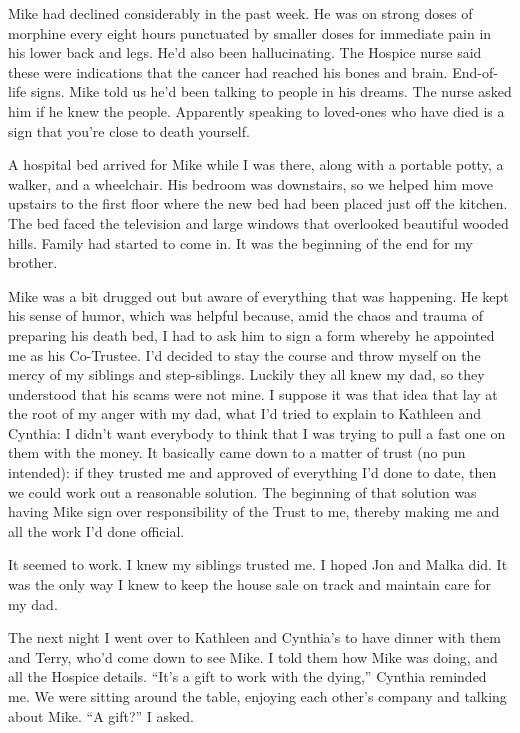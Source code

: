 \documentclass[12pt]{book}
\begin{document}
Mike had declined considerably in the past week. He was on strong doses of morphine every eight hours punctuated by smaller doses for immediate pain in his lower back and legs. He'd also been hallucinating. The Hospice nurse said these were indications that the cancer had reached his bones and brain. End-of-life signs. Mike told us he'd been talking to people in his dreams. The nurse asked him if he knew the people. Apparently speaking to loved-ones who have died is a sign that you're close to death yourself.

A hospital bed arrived for Mike while I was there, along with a portable potty, a walker, and a wheelchair. His bedroom was downstairs, so we helped him move upstairs to the first floor where the new bed had been placed just off the kitchen. The bed faced the television and large windows that overlooked beautiful wooded hills. Family had started to come in. It was the beginning of the end for my brother.

Mike was a bit drugged out but aware of everything that was happening. He kept his sense of humor, which was helpful because, amid the chaos and trauma of preparing his death bed, I had to ask him to sign a form whereby he appointed me as his Co-Trustee. I'd decided to stay the course and throw myself on the mercy of my siblings and step-siblings. Luckily they all knew my dad, so they understood that his scams were not mine. I suppose it was that idea that lay at the root of my anger with my dad, what I'd tried to explain to Kathleen and Cynthia: I didn't want everybody to think that I was trying to pull a fast one on them with the money. It basically came down to a matter of trust (no pun intended): if they trusted me and approved of everything I'd done to date, then we could work out a reasonable solution. The beginning of that solution was having Mike sign over responsibility of the Trust to me, thereby making me and all the work I'd done official.

It seemed to work. I knew my siblings trusted me. I hoped Jon and Malka did. It was the only way I knew to keep the house sale on track and maintain care for my dad.

The next night I went over to Kathleen and Cynthia's to have dinner with them and Terry, who'd come down to see Mike. I told them how Mike was doing, and all the Hospice details. ``It's a gift to work with the dying,'' Cynthia reminded me. We were sitting around the table, enjoying each other's company and talking about Mike. ``A gift?'' I asked.
\end{document}
